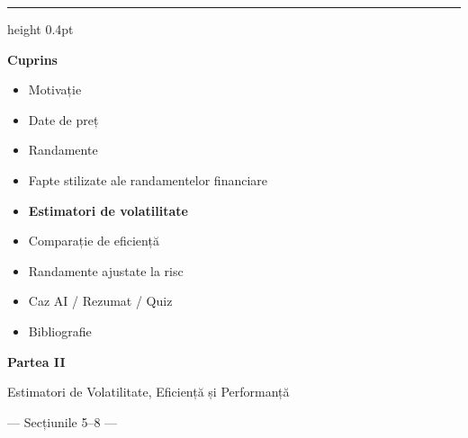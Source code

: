 \documentclass[9pt, aspectratio=169, t]{beamer}
\theoremstyle{definition}
\begin{document}

{
\begin{frame}{}
    {\color{FooterGray}\hrule height 0.4pt}
    \vspace{0.1cm}
    {\Large\textcolor{IDAred}{\textbf{Cuprins}}}
    \vspace{0.2cm}
    \begin{itemize}
        \item Motivație \checkmark
        \item Date de preț \checkmark
        \item Randamente \checkmark
        \item Fapte stilizate ale randamentelor financiare \checkmark
        \item \textbf{Estimatori de volatilitate}
        \item Comparație de eficiență
        \item Randamente ajustate la risc
        \item Caz AI / Rezumat / Quiz
        \item Bibliografie
    \end{itemize}
\end{frame}
}

{
\begin{frame}[plain]
\vfill
\begin{center}
{\Huge\textcolor{IDAred}{\textbf{Partea II}}}

\vspace{0.6cm}

{\Large\textcolor{MainBlue}{Estimatori de Volatilitate, Eficiență și Performanță}}

\vspace{0.4cm}

{\large\textcolor{MediumGray}{--- Secțiunile 5--8 ---}}
\end{center}
\vfill
\end{frame}
}
\end{document}
